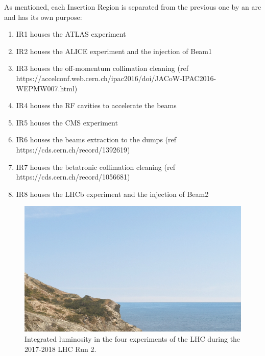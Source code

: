 As mentioned, each Insertion Region is separated from the previous one by an arc and has its own purpose:
\begin{enumerate}
    \item IR1 houses the ATLAS experiment
    \item IR2 houses the ALICE experiment and the injection of Beam1
    \item IR3 houses the off-momentum collimation cleaning (ref https://accelconf.web.cern.ch/ipac2016/doi/JACoW-IPAC2016-WEPMW007.html)
    \item IR4 houses the RF cavities to accelerate the beams
    \item IR5 houses the CMS experiment
    \item IR6 houses the beams extraction to the dumps (ref https://cds.cern.ch/record/1392619)
    \item IR7 houses the betatronic collimation cleaning (ref https://cds.cern.ch/record/1056681)
    \item IR8 houses the LHCb experiment and the injection of Beam2
\end{enumerate}

\begin{figure}[h]
  \centering
  \includegraphics[width=0.5\columnwidth]{Figures/placeholder.png}
  \caption{Integrated luminosity in the four experiments of the LHC during the 2017-2018 LHC Run 2.}
  \label{fig:run_II_luminosities}
\end{figure}


